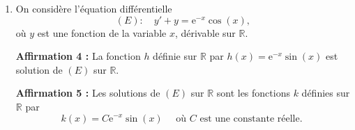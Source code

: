 \documentclass[10pt]{article}
\providecommand{\R}{\mathbb{R}}
\providecommand{\e}{{\mathrm{e}}}
\begin{document}
\begin{enumerate}
\begin{center}
	\end{center}

	\textbf{Affirmation 3:} \quad $P_{B}\big(\,\overline{A}\,\big)=\dfrac{9}{50}$.

	\item On considère l'équation différentielle
	\[(E): \quad y'+y=\e^{-x} \cos (x),\]
	où $y$ est une fonction de la variable $x$, dérivable sur $\R$.

	\textbf{Affirmation 4 :} La fonction $h$ définie sur $\R$ par $h(x)=\e^{-x} \sin (x)$ est solution de $(E)$ sur $\R$.

	\textbf{Affirmation 5 :} Les solutions de $(E)$ sur $\R$ sont les fonctions $k$ définies sur $\R$ par
	\[k(x)=C \e^{-x} \sin (x) \quad\text { où } C \text { est une constante réelle. }\]
\end{enumerate}
\end{document}
